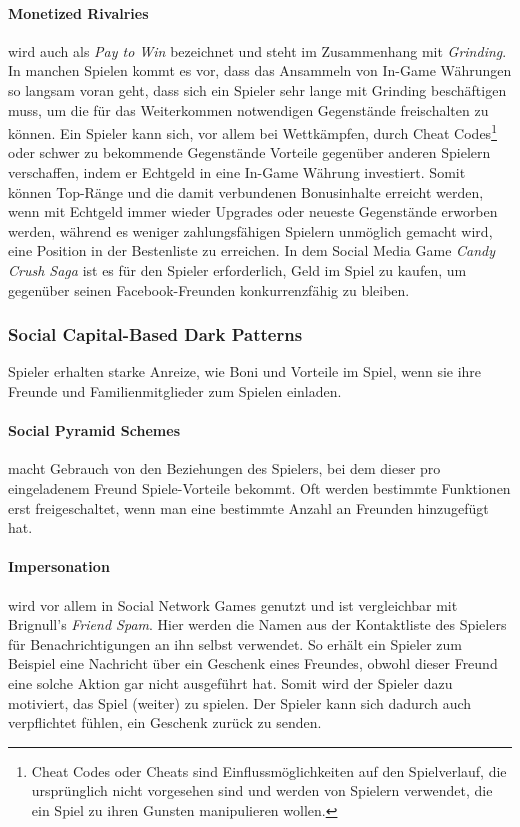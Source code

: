 \documentclass[a4paper]{article}
\begin{document}
\paragraph{Monetized Rivalries} 
\label{para:monetized_rivalries}
wird auch als \textit{Pay to Win} bezeichnet und steht im Zusammenhang mit \textit{Grinding}. In manchen Spielen kommt es vor, dass das Ansammeln von In-Game Währungen so langsam voran geht, dass sich ein Spieler sehr lange mit Grinding beschäftigen muss, um die für das Weiterkommen notwendigen Gegenstände freischalten zu können.\newline
Ein Spieler kann sich, vor allem bei Wettkämpfen, durch Cheat Codes\footnote{\label{foot:11} Cheat Codes oder Cheats sind Einflussmöglichkeiten auf den Spielverlauf, die ursprünglich nicht vorgesehen sind und werden von Spielern verwendet, die ein Spiel zu ihren Gunsten manipulieren wollen.} oder schwer zu bekommende Gegenstände Vorteile gegenüber anderen Spielern verschaffen, indem er Echtgeld in eine In-Game Währung investiert. Somit können Top-Ränge und die damit verbundenen Bonusinhalte erreicht werden, wenn mit Echtgeld immer wieder Upgrades oder neueste Gegenstände erworben werden, während es weniger zahlungsfähigen Spielern unmöglich gemacht wird, eine Position in der Bestenliste zu erreichen.\newline
In dem Social Media Game \textit{Candy Crush Saga} ist es für den Spieler erforderlich, Geld im Spiel zu kaufen, um gegenüber seinen Facebook-Freunden konkurrenzfähig zu bleiben.  

\subsubsection{Social Capital-Based Dark Patterns}
\label{sssec:social_capital_based_dark_patterns}
Spieler erhalten starke Anreize, wie Boni und Vorteile im Spiel, wenn sie ihre Freunde und Familienmitglieder zum Spielen einladen.

\paragraph{Social Pyramid Schemes}
\label{para:social_pyramid_schemes}
macht Gebrauch von den Beziehungen des Spielers, bei dem dieser pro eingeladenem Freund Spiele-Vorteile bekommt. Oft werden bestimmte Funktionen erst freigeschaltet, wenn man eine bestimmte Anzahl an Freunden hinzugefügt hat.

\paragraph{Impersonation}
\label{para:impersonation}
wird vor allem in Social Network Games genutzt und ist vergleichbar mit Brignull's \textit{Friend Spam}. Hier werden die Namen aus der Kontaktliste des Spielers für Benachrichtigungen an ihn selbst verwendet. So erhält ein Spieler zum Beispiel eine Nachricht über ein Geschenk eines Freundes, obwohl dieser Freund eine solche Aktion gar nicht ausgeführt hat. Somit wird der Spieler dazu motiviert, das Spiel (weiter) zu spielen. Der Spieler kann sich dadurch auch verpflichtet fühlen, ein Geschenk zurück zu senden.
\end{document}
